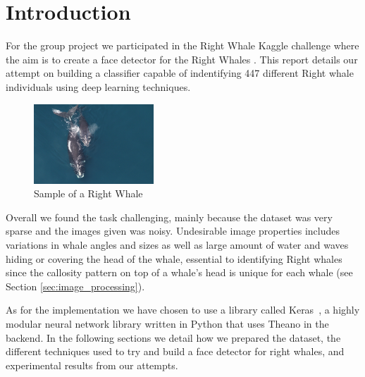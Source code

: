 \section{Introduction}
For the group project we participated in the Right Whale Kaggle challenge where the aim is to create a face detector for the Right Whales \cite{kaggle2015}. This report details our attempt on building a classifier capable of indentifying 447 different Right whale individuals using deep learning techniques. 

\begin{figure}
	\vspace{-0.5cm}
	\centering
	
	\includegraphics[width=0.4\textwidth]{sections/imgs/dataset/right_whale_example.png}
	\caption{Sample of a Right Whale}
	\label{fig:right_whale_sample}
	
	\vspace{-0cm}
\end{figure}

Overall we found the task challenging, mainly because the dataset was very sparse and the images given was noisy. Undesirable image properties includes variations in whale angles and sizes as well as large amount of water and waves hiding or covering the head of the whale, essential to identifying Right whales since the callosity pattern on top of a whale's head is unique for each whale (see Section \ref{sec:image_processing}).

As for the implementation we have chosen to use a library called Keras~\cite{keras2015}, a highly modular neural network library written in Python that uses Theano in the backend. In the following sections we detail how we prepared the dataset, the different techniques used to try and build a face detector for right whales, and experimental results from our attempts.